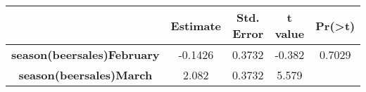 \documentclass[]{book}
\theoremstyle{definition}
\theoremstyle{definition}
\theoremstyle{remark}
\begin{document}
\begin{longtable}[c]{@{}ccccc@{}}
\toprule
\begin{minipage}[b]{0.37\columnwidth}\centering\strut
~
\strut\end{minipage} &
\begin{minipage}[b]{0.12\columnwidth}\centering\strut
Estimate
\strut\end{minipage} &
\begin{minipage}[b]{0.14\columnwidth}\centering\strut
Std. Error
\strut\end{minipage} &
\begin{minipage}[b]{0.11\columnwidth}\centering\strut
t value
\strut\end{minipage} &
\begin{minipage}[b]{0.11\columnwidth}\centering\strut
Pr(\textgreater{}\textbar{}t\textbar{})
\strut\end{minipage}\tabularnewline
\midrule
\endhead
\begin{minipage}[t]{0.37\columnwidth}\centering\strut
\textbf{season(beersales)February}
\strut\end{minipage} &
\begin{minipage}[t]{0.12\columnwidth}\centering\strut
-0.1426
\strut\end{minipage} &
\begin{minipage}[t]{0.14\columnwidth}\centering\strut
0.3732
\strut\end{minipage} &
\begin{minipage}[t]{0.11\columnwidth}\centering\strut
-0.382
\strut\end{minipage} &
\begin{minipage}[t]{0.11\columnwidth}\centering\strut
0.7029
\strut\end{minipage}\tabularnewline
\begin{minipage}[t]{0.37\columnwidth}\centering\strut
\textbf{season(beersales)March}
\strut\end{minipage} &
\begin{minipage}[t]{0.12\columnwidth}\centering\strut
2.082
\strut\end{minipage} &
\begin{minipage}[t]{0.14\columnwidth}\centering\strut
0.3732
\strut\end{minipage} &
\begin{minipage}[t]{0.11\columnwidth}\centering\strut
5.579
\strut\end{minipage} &
\begin{minipage}[t]{0.11\columnwidth}\centering\strut

\end{minipage}
\end{longtable}
\end{document}

